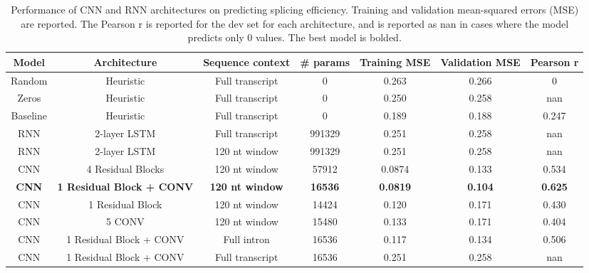 \documentclass{article}
\begin{document}
\begin{table}[H]
\centering
\tiny
 \begin{tabular}{||c | c | c | c | c | c | c||} 
 \hline
 Model & Architecture & Sequence context & \# params & Training MSE & Validation MSE & Pearson r \\ [0.5ex] 
 \hline\hline
 Random & Heuristic & Full transcript & 0 & 0.263 & 0.266 & 0 \\ \hline
 Zeros & Heuristic & Full transcript & 0 & 0.250 & 0.258 & nan \\ \hline
 Baseline & Heuristic & Full transcript & 0 & 0.189 & 0.188 & 0.247 \\ \hline
 RNN & 2-layer LSTM & Full transcript & 991329 & 0.251 & 0.258 & nan \\ 
 \hline
 RNN & 2-layer LSTM & 120 nt window & 991329 & 0.251 & 0.258 & nan \\ 
 \hline
 CNN & 4 Residual Blocks & 120 nt window & 57912 & 0.0874 & 0.133 & 0.534 \\ 
 \hline
  {\bf CNN} & {\bf 1 Residual Block + CONV} & {\bf 120 nt window} & {\bf 16536} & {\bf 0.0819} & {\bf0.104 } & {\bf 0.625} \\ 
 \hline
   CNN &1 Residual Block & 120 nt window & 14424 & 0.120 & 0.171 & 0.430 \\ 
 \hline
   CNN & 5 CONV & 120 nt window & 15480 & 0.133 & 0.171 & 0.404 \\
 \hline
   CNN &1 Residual Block + CONV & Full intron & 16536 & 0.117 & 0.134 & 0.506 \\
\hline
   CNN &1 Residual Block + CONV & Full transcript & 16536 & 0.251 & 0.258 & nan\\
 \hline
 \hline
\end{tabular} \newline \\
\caption{Performance of CNN and RNN architectures on predicting splicing efficiency. Training and validation mean-squared errors (MSE) are reported. The Pearson r is reported for the dev set for each architecture, and is reported as nan in cases where the model predicts only 0 values. The best model is bolded.}
\label{tab:perf}
\end{table}
\end{document}
